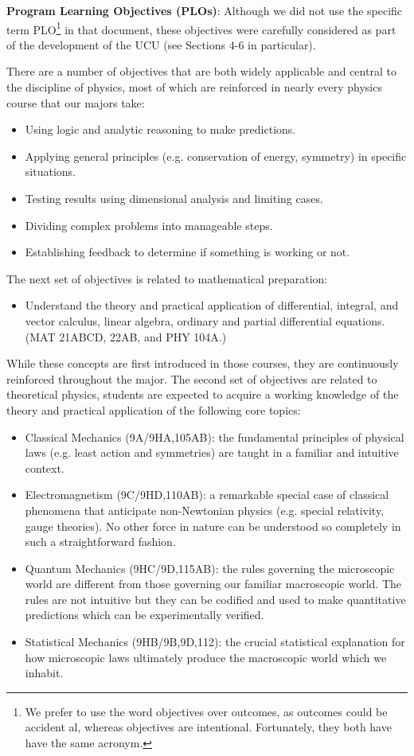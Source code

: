 \documentclass[12pt]{article}
\begin{document}
\noindent
{\bf Program Learning Objectives (PLOs)}: Although we did not use the
specific term PLO\footnote{We prefer to use the word objectives over
outcomes, as outcomes could be accident al, whereas objectives are
intentional.  Fortunately, they both have have the same acronym.} in
that document, these objectives were carefully considered as part of
the development of the UCU (see Sections 4-6 in particular).

There are a number of objectives that are both widely applicable and
central to the discipline of physics, most of which are reinforced in
nearly every physics course that our majors take:
\begin{itemize}
 \item Using logic and analytic reasoning to make predictions.
 \item Applying general principles (e.g. conservation of energy, symmetry) in specific situations. 
 \item Testing results using dimensional analysis and limiting cases. 
 \item Dividing complex problems into manageable steps.
 \item Establishing feedback to determine if something is working or not.
\end{itemize}  
The next set of objectives is related to mathematical preparation:
\begin{itemize}
\item Understand the theory and practical application of differential, integral, and vector calculus, linear algebra, ordinary and partial differential equations.  (MAT 21ABCD, 22AB, and PHY 104A.)
\end{itemize}
While these concepts are first introduced in those courses, they are continuously reinforced throughout the major.  The second set of objectives are related to theoretical physics, students are expected to acquire a working knowledge of the theory and practical application of the following core topics:
\begin{itemize}
 \item Classical Mechanics (9A/9HA,105AB): the fundamental principles of physical laws
  (e.g. least action and symmetries) are taught in a familiar and intuitive context. 
\item Electromagnetism (9C/9HD,110AB): a remarkable special case of classical
  phenomena that anticipate non-Newtonian physics (e.g. special
  relativity, gauge theories).  No other force in nature can be understood so
  completely in such a straightforward fashion.  
\item Quantum Mechanics (9HC/9D,115AB): the rules governing the microscopic world are
  different from those governing our familiar macroscopic world.  The
  rules are not intuitive but they can be codified and used to make
  quantitative predictions which can be experimentally verified.
\item Statistical Mechanics (9HB/9B,9D,112): the crucial statistical explanation for how
  microscopic laws ultimately produce the macroscopic world which we inhabit.
\end{itemize}
\end{document}
